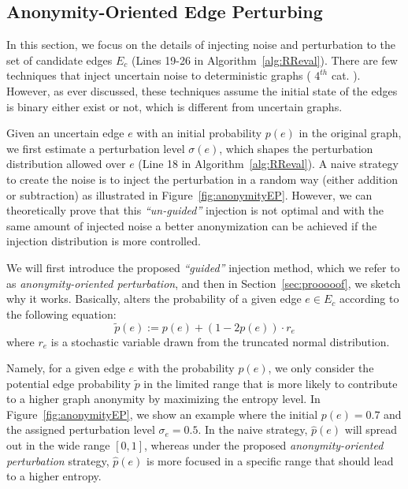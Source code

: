 \subsection{Anonymity-Oriented Edge Perturbing}
\label{sec:perturbation}

In this section, we focus on the details of injecting noise and perturbation to the set of candidate edges $E_c$ (Lines 19-26 in Algorithm~\ref{alg:RReval}). There are few techniques that inject uncertain noise to deterministic graphs ( $4^{th}$ cat. \cite{Boldi_Injecting_2012, Nguyen_Anonymizing_2015, Mittal_Preserving_2013}). However, as ever discussed, these techniques assume the initial state of the edges is binary either exist or not, which is different from uncertain graphs.   

Given an uncertain edge $e$ with an initial probability $p(e)$ in the original graph, we first estimate a perturbation level $\sigma(e)$, 
which shapes the perturbation distribution allowed over $e$ (Line 18 in Algorithm~\ref{alg:RReval}).
A naive strategy to create the noise is to inject the perturbation in a random way (either addition or subtraction) as illustrated in Figure~\ref{fig:anonymityEP}. 
However, we can theoretically prove that this {\em ``un-guided''} injection is not optimal and with the same amount of injected noise a better anonymization can be achieved 
if the injection distribution is more controlled. 

We will first introduce the proposed {\em ``guided''} injection method, which we refer to as {\em anonymity-oriented perturbation}, and then in Section~\ref{sec:prooooof}, we sketch why it works.
Basically, \SysName alters the probability of a given edge $e \in E_{c}$ according to the following equation:
\begin{equation*}
    \tilde{\mathit{p}}(e):=\mathit{p}(e) + (1-2 \mathit{p}(e)) \cdot r_{e} 
\end{equation*} 
where $r_{e}$ is a stochastic variable drawn from the truncated normal distribution.  


Namely, for a given edge $e$ with the probability $p(e)$, we only consider the potential edge probability $\tilde{p}$ in the limited range that 
is more likely to contribute to a higher graph anonymity by maximizing the entropy level. 
In Figure~\ref{fig:anonymityEP}, we show an example where the initial $p(e)=0.7$ and the assigned perturbation level $\sigma_{e}=0.5$. 
In the naive strategy, $\hat{p}(e)$ will spread out in the wide range $[0,1]$, whereas under the 
proposed {\em anonymity-oriented perturbation} strategy,  $\hat{p}(e)$ is more focused in a specific range that should lead to a higher entropy.


